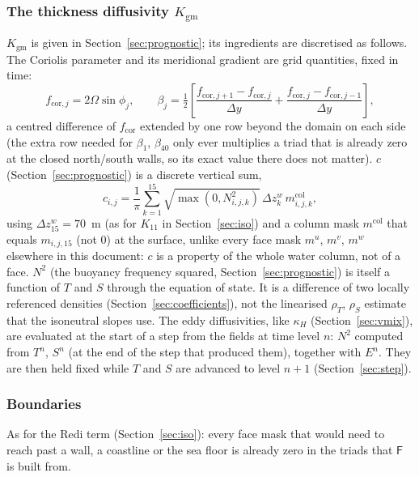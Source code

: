 \documentclass{article}
\begin{document}
\subsubsection*{The thickness diffusivity $K_\text{gm}$}
$K_\text{gm}$ is given in Section~\ref{sec:prognostic}; its ingredients are discretised as follows.
The Coriolis parameter and its meridional gradient are grid quantities, fixed in time:
\[
f_{\text{cor},j} = 2\Omega\sin\phi_j,
\qquad
\beta_j = \tfrac{1}{2}\left[ \frac{f_{\text{cor},j+1}-f_{\text{cor},j}}{\Delta y} + \frac{f_{\text{cor},j}-f_{\text{cor},j-1}}{\Delta y} \right],
\]
a centred difference of $f_\text{cor}$ extended by one row beyond the domain on each side (the extra row needed for $\beta_1$, $\beta_{40}$ only ever multiplies a triad that is already zero at the closed north/south walls, so its exact value there does not matter).
$c$ (Section~\ref{sec:prognostic}) is a discrete vertical sum,
\[
c_{i,j} = \frac{1}{\pi}\sum_{k=1}^{15} \sqrt{\max(0,N^2_{i,j,k})}\,\Delta z^w_k\, m^\text{col}_{i,j,k},
\]
using $\Delta z^w_{15}=70$~m (as for $K_{11}$ in Section~\ref{sec:iso}) and a column mask $m^\text{col}$ that equals $m_{i,j,15}$ (not $0$) at the surface, unlike every face mask $m^u$, $m^v$, $m^w$ elsewhere in this document: $c$ is a property of the whole water column, not of a face.
$N^2$ (the buoyancy frequency squared, Section~\ref{sec:prognostic}) is itself a function of $T$ and $S$ through the equation of state. It is a difference of two locally referenced densities (Section~\ref{sec:coefficients}), not the linearised $\rho_T$, $\rho_S$ estimate that the isoneutral slopes use.
The eddy diffusivities, like $\kappa_H$ (Section~\ref{sec:vmix}), are evaluated at the start of a step from the fields at time level $n$: $N^2$ computed from $T^n$, $S^n$ (at the end of the step that produced them), together with $E^n$. They are then held fixed while $T$ and $S$ are advanced to level $n+1$ (Section~\ref{sec:step}).

\subsubsection*{Boundaries}
As for the Redi term (Section~\ref{sec:iso}): every face mask that would need to reach past a wall, a coastline or the sea floor is already zero in the triads that $\mathsf{F}$ is built from.
\end{document}
